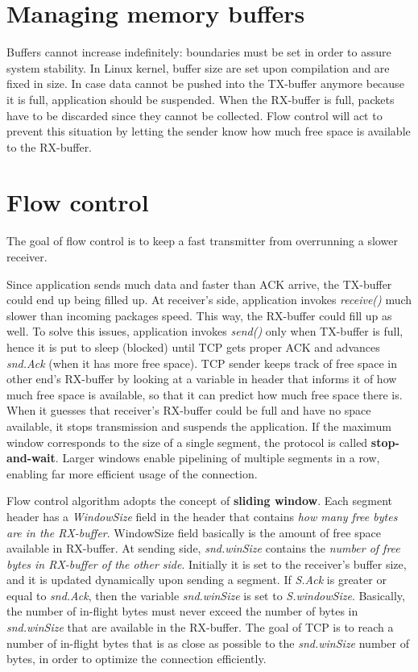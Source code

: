 \documentclass[a4paper, 11pt]{report}
\begin{document}
\section{Managing memory buffers}

Buffers cannot increase indefinitely: boundaries must be set in order to assure
system stability. In Linux kernel, buffer size are set upon compilation and are
fixed in size. In case data cannot be pushed into the TX-buffer anymore because
it is full, application should be suspended. When the RX-buffer is full,
packets have to be discarded since they cannot be collected. Flow control will
act to prevent this situation by letting the sender know how much free space is
available to the RX-buffer.
\section{Flow control}

The goal of flow control is to keep a fast transmitter from overrunning a
slower receiver.

Since application sends much data and faster than ACK arrive, the TX-buffer
could end up being filled up. At receiver's side, application invokes
\emph{receive()} much slower than incoming packages speed. This way, the
RX-buffer could fill up as well. To solve this issues, application invokes
\emph{send()} only when TX-buffer is full, hence it is put to sleep (blocked)
until TCP gets proper ACK and advances \emph{snd.Ack} (when it has more free
space). TCP sender keeps track of free space in other end's RX-buffer by
looking at a variable in header that informs it of how much free space is
available, so that it can predict how much free space there is. When it guesses
that receiver's RX-buffer could be full and have no space available, it stops
transmission and suspends the application. If the maximum window corresponds to
the size of a single segment, the protocol is called \textbf{stop-and-wait}.
Larger windows enable pipelining of multiple segments in a row, enabling far
more efficient usage of the connection.

Flow control algorithm adopts the concept of \textbf{sliding window}. Each
segment header has a \emph{WindowSize} field in the header that contains
\emph{how many free bytes are in the RX-buffer}. WindowSize field basically is
the amount of free space available in RX-buffer. At sending side,
\emph{snd.winSize} contains the \emph{number of free bytes in RX-buffer of
the other side}. Initially it is set to the receiver's buffer size, and it is
updated dynamically upon sending a segment. If \emph{S.Ack} is greater or
equal to \emph{snd.Ack}, then the variable \emph{snd.winSize} is set to
\emph{S.windowSize}. Basically, the number of in-flight bytes must never
exceed the number of bytes in \emph{snd.winSize} that are available in the
RX-buffer. The goal of TCP is to reach a number of in-flight bytes that is as
close as possible to the \emph{snd.winSize} number of bytes, in order to
optimize the connection efficiently.
\end{document}
